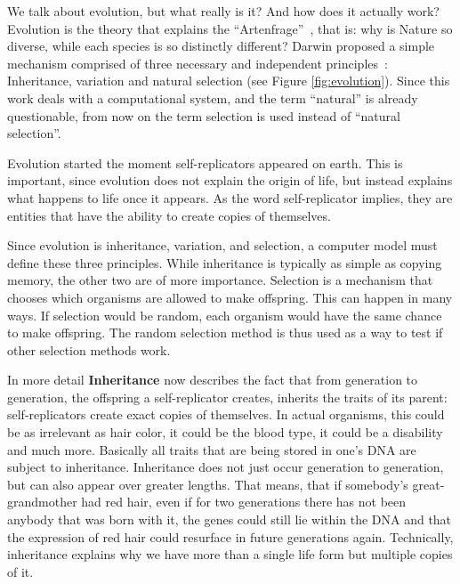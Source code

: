 \documentclass[12pt,oneside,listof=totoc,paper=a4,headings=small]{scrbook}
\begin{document}
We talk about evolution, but what really is it?  And how does it actually work?
Evolution is the theory that explains the ``Artenfrage''~\cite{darwin2004origin}, that is: why is Nature so diverse, while each species is so distinctly different? Darwin proposed a simple mechanism comprised of three necessary and independent principles~\cite{huxley1942evolution}: Inheritance, variation and natural selection (see Figure \ref{fig:evolution}). 
Since this work deals with a computational system, and the term ``natural'' is already questionable, from now on the term selection is used instead of ``natural selection''.

Evolution started the moment self-replicators appeared on earth. This is important, since evolution does not explain the origin of life, but instead explains what happens to life once it appears. As the word self-replicator implies, they are entities that have the ability to create copies of themselves. 

Since evolution is inheritance, variation, and selection, a computer model must define these three principles. While inheritance is typically as simple as copying memory, the other two are of more importance. Selection is a mechanism that chooses which organisms are allowed to make offspring. This can happen in many ways. If selection would be random, each organism would have the same chance to make offspring. The random selection method is thus used as a way to test if other selection methods work.

In more detail \textbf{Inheritance} now describes the fact that from generation to generation, the offspring a self-replicator creates, inherits the traits of its parent: self-replicators create exact copies of themselves. In actual organisms, this could be as irrelevant as hair color, it could be the blood type, it could be a disability and much more. Basically all traits that are being stored in one's DNA are subject to inheritance. Inheritance does not just occur generation to generation, but can also appear over greater lengths. That means, that if somebody's great-grandmother had red hair, even if for two generations there has not been anybody that was born with it, the genes could still lie within the DNA and that the expression of red hair could resurface in future generations again.
Technically, inheritance explains why we have more than a single life form but multiple copies of it.
\end{document}
